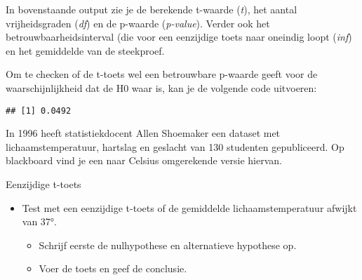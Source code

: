 \documentclass[]{book}
\newenvironment{Shaded}{\begin{snugshade}}{\end{snugshade}}
\newcommand{\KeywordTok}[1]{\textcolor[rgb]{0.13,0.29,0.53}{\textbf{{#1}}}}
\newcommand{\DataTypeTok}[1]{\textcolor[rgb]{0.13,0.29,0.53}{{#1}}}
\newcommand{\DecValTok}[1]{\textcolor[rgb]{0.00,0.00,0.81}{{#1}}}
\newcommand{\FloatTok}[1]{\textcolor[rgb]{0.00,0.00,0.81}{{#1}}}
\newcommand{\StringTok}[1]{\textcolor[rgb]{0.31,0.60,0.02}{{#1}}}
\newcommand{\CommentTok}[1]{\textcolor[rgb]{0.56,0.35,0.01}{\textit{{#1}}}}
\newcommand{\NormalTok}[1]{{#1}}
\providecommand{\tightlist}{%
  \setlength{\itemsep}{0pt}\setlength{\parskip}{0pt}}
\theoremstyle{definition}
\theoremstyle{definition}
\theoremstyle{definition}
\theoremstyle{remark}
\let\BeginKnitrBlock\begin \let\EndKnitrBlock\end
\begin{document}
In bovenstaande output zie je de berekende t-waarde (\emph{t}), het
aantal vrijheidsgraden (\emph{df}) en de p-waarde (\emph{p-value}).
Verder ook het betrouwbaarheidsinterval (die voor een eenzijdige toets
naar oneindig loopt (\emph{inf}) en het gemiddelde van de steekproef.

Om te checken of de t-toets wel een betrouwbare p-waarde geeft voor de
waarschijnlijkheid dat de H0 waar is, kan je de volgende code uitvoeren:

\begin{Shaded}
\end{Shaded}

\begin{verbatim}
## [1] 0.0492
\end{verbatim}

In 1996 heeft statistiekdocent Allen Shoemaker een dataset met
lichaamstemperatuur, hartslag en geslacht van 130 studenten
gepubliceerd. Op blackboard vind je een naar Celsius omgerekende versie
hiervan.

\BeginKnitrBlock{exercise}
\protect\hypertarget{exr:onesamplettest}{}{\label{exr:onesamplettest}
}Eenzijdige t-toets

\begin{itemize}
\tightlist
\item
  Test met een eenzijdige t-toets of de gemiddelde lichaamstemperatuur
  afwijkt van 37°.

  \begin{itemize}
  \tightlist
  \item
    Schrijf eerste de nulhypothese en alternatieve hypothese op.
  \item
    Voer de toets en geef de conclusie.
  \end{itemize}
\end{itemize}
\EndKnitrBlock{exercise}
\end{document}
